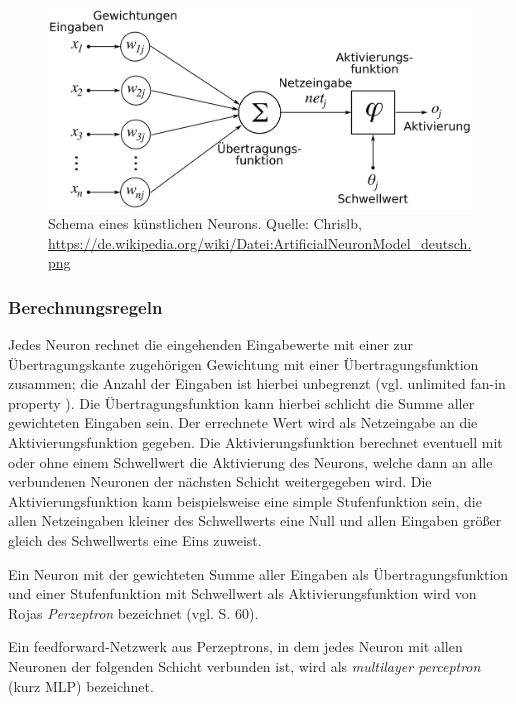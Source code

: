 \documentclass[
	twoside,
	12pt,
	a4paper,
	BCOR10mm,
	DIV14,
	listof=totoc,
	bibliography=totoc,
	headsepline
]{scrreprt}
\begin{document}
\begin{figure}[h]
	\begin{center}
		\includegraphics[totalheight=0.2\textheight]{Bilder/ArtificialNeuronModel_deutsch.png}
	\end{center}
	\caption{Schema eines künstlichen Neurons. Quelle: Chrislb, \url{https://de.wikipedia.org/wiki/Datei:ArtificialNeuronModel_deutsch.png}} %
	\label{fig:Neuron}
\end{figure}

\subsubsection{Berechnungsregeln}
Jedes Neuron rechnet die eingehenden Eingabewerte mit einer zur Übertragungskante zugehörigen Gewichtung mit einer Übertragungsfunktion zusammen; die Anzahl der Eingaben ist hierbei unbegrenzt (vgl. \glqq unlimited fan-in property\grqq{} \cite{Rojas:1996:NNS:235222}). Die Übertragungsfunktion kann hierbei schlicht die Summe aller gewichteten Eingaben sein. Der errechnete Wert wird als Netzeingabe an die Aktivierungsfunktion gegeben. 
Die Aktivierungsfunktion berechnet eventuell mit oder ohne einem Schwellwert die Aktivierung des Neurons, welche dann an alle verbundenen Neuronen der nächsten Schicht weitergegeben wird.
Die Aktivierungsfunktion kann beispielsweise eine simple Stufenfunktion sein, die allen Netzeingaben kleiner des Schwellwerts eine Null und allen Eingaben größer gleich des Schwellwerts eine Eins zuweist.

Ein Neuron mit der gewichteten Summe aller Eingaben als Übertragungsfunktion und einer Stufenfunktion mit Schwellwert als Aktivierungsfunktion wird von Rojas \textit{Perzeptron} bezeichnet (vgl. \cite{Rojas:1996:NNS:235222} S. 60).
\medskip

Ein feedforward-Netzwerk aus Perzeptrons, in dem jedes Neuron mit allen Neuronen der folgenden Schicht verbunden ist, wird als \textit{multilayer perceptron} (kurz MLP) bezeichnet.
\end{document}
